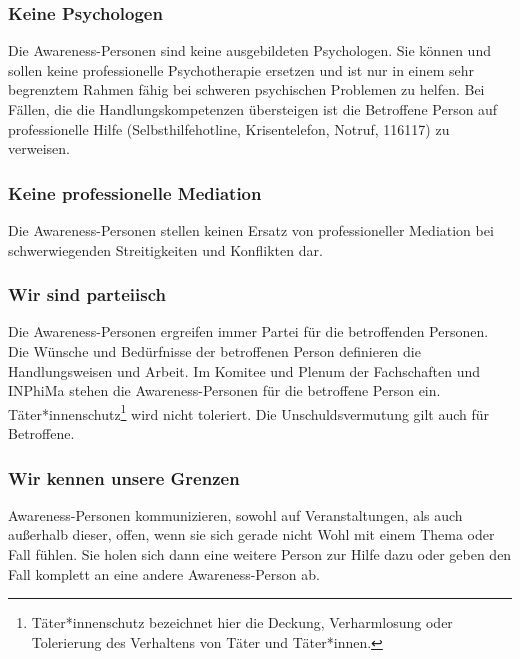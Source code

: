\documentclass{article}
\begin{document}
\subsubsection{Keine Psychologen}
Die Awareness-Personen sind keine ausgebildeten Psychologen. Sie können und sollen keine professionelle Psychotherapie ersetzen und ist nur in einem sehr begrenztem Rahmen fähig bei schweren psychischen Problemen zu helfen. Bei Fällen, die die Handlungskompetenzen übersteigen ist die Betroffene Person auf professionelle Hilfe (Selbsthilfehotline, Krisentelefon, Notruf, 116117) zu verweisen. 

\subsubsection{Keine professionelle Mediation}
Die Awareness-Personen stellen keinen Ersatz von professioneller Mediation bei schwerwiegenden Streitigkeiten und Konflikten dar. 

\subsubsection{Wir sind parteiisch}
Die Awareness-Personen ergreifen immer Partei für die betroffenden Personen. Die Wünsche und Bedürfnisse der betroffenen Person definieren die Handlungsweisen und Arbeit. Im Komitee und Plenum der Fachschaften und INPhiMa stehen die Awareness-Personen für die betroffene Person ein. Täter*innenschutz\footnote{Täter*innenschutz bezeichnet hier die Deckung, Verharmlosung oder Tolerierung des Verhaltens von Täter und Täter*innen.} wird nicht toleriert. Die Unschuldsvermutung gilt auch für Betroffene.

\subsubsection{Wir kennen unsere Grenzen}
Awareness-Personen kommunizieren, sowohl auf Veranstaltungen, als auch außerhalb dieser, offen, wenn sie sich gerade nicht Wohl mit einem Thema oder Fall fühlen. Sie holen sich dann eine weitere Person zur Hilfe dazu oder geben den Fall komplett an eine andere Awareness-Person ab. 
\end{document}
